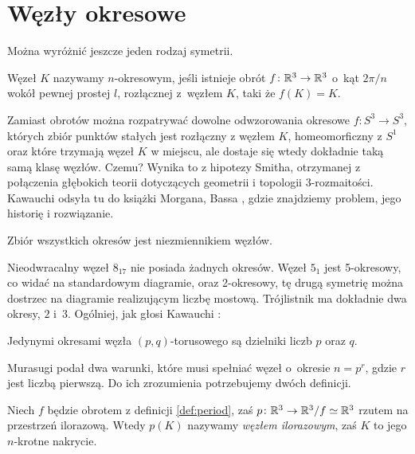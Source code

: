 
\section{Węzły okresowe}
%
Można wyróżnić jeszcze jeden rodzaj symetrii.

\begin{definition}
\label{def:period}%
    Węzeł $K$ nazywamy $n$-okresowym, jeśli istnieje obrót $f \colon \mathbb R^3 \to \mathbb R^3$ o~kąt $2\pi/n$ wokół pewnej prostej $l$, rozłącznej z~węzłem $K$, taki że $f(K) = K$.
\end{definition}

Zamiast obrotów można rozpatrywać dowolne odwzorowania okresowe $f \colon S^3 \to S^3$, których zbiór punktów stałych jest rozłączny z węzłem $K$, homeomorficzny z $S^1$ oraz które trzymają węzeł $K$ w miejscu, ale dostaje się wtedy dokładnie taką samą klasę węzłów.
Czemu?
Wynika to z hipotezy Smitha, otrzymanej z połączenia głębokich teorii dotyczących geometrii i topologii 3-rozmaitości.
%
Kawauchi \cite[s. 125]{kawauchi1996} odsyła tu do książki Morgana, Bassa \cite{morgan1984}, gdzie znajdziemy problem, jego historię i rozwiązanie.
%
%

\begin{proposition}
    Zbiór wszystkich okresów jest niezmiennikiem węzłów.
\end{proposition}

Nieodwracalny węzeł $8_{17}$ nie posiada żadnych okresów.
Węzeł $5_1$ jest 5-okresowy, co widać na standardowym diagramie, oraz 2-okresowy, tę drugą symetrię można dostrzec na diagramie realizującym liczbę mostową.
Trójlistnik ma dokładnie dwa okresy, $2$ i~$3$.
Ogólniej, jak głosi Kawauchi \cite[ćwiczenie 10.1.9]{kawauchi1996}:

\begin{proposition}
    Jedynymi okresami węzła $(p, q)$-torusowego są dzielniki liczb $p$ oraz $q$.
\end{proposition}

Murasugi podał dwa warunki, które musi spełniać węzeł o~okresie $n = p^r$, gdzie $r$ jest liczbą pierwszą.
%
Do ich zrozumienia potrzebujemy dwóch definicji.

\begin{definition}
    Niech $f$ będzie obrotem z definicji \ref{def:period}, zaś $p \colon \mathbb R^3 \to \mathbb R^3/f \simeq \mathbb R^3$ rzutem na przestrzeń ilorazową.
%
    Wtedy $p(K)$ nazywamy \emph{węzłem ilorazowym}, zaś $K$ to jego $n$-krotne nakrycie.    
\end{definition}

